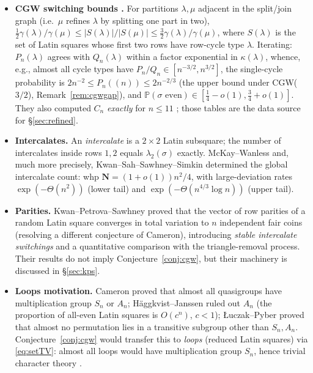 \documentclass[11pt]{article}
\theoremstyle{definition}
\renewcommand{\Pr}{\mathbb{P}}
\newcommand{\PP}{P}
\newcommand{\QQ}{Q}
\newcommand{\CC}{C}
\begin{document}
\begin{itemize}[leftmargin=2em]
\item \textbf{CGW switching bounds \cite{CGW08}.}  For partitions
$\lambda,\mu$ adjacent in the split/join graph (i.e.\ $\mu$ refines
$\lambda$ by splitting one part in two),
$\tfrac12\gamma(\lambda)/\gamma(\mu)\le |S(\lambda)|/|S(\mu)| \le
\tfrac32\gamma(\lambda)/\gamma(\mu)$, where $S(\lambda)$ is the set of Latin
squares whose first two rows have row-cycle type $\lambda$.  Iterating:
$\PP_n(\lambda)$ agrees with $\QQ_n(\lambda)$ within a factor
exponential in $\kappa(\lambda)$, whence, e.g., almost all cycle types have
$\PP_n/\QQ_n\in[n^{-3/2},n^{3/2}]$, the single-cycle probability is
$2n^{-2}\le \PP_n((n))\le 2n^{-2/3}$ (the upper bound under CGW($3/2$), Remark~\ref{rem:cgwgap}), and
$\Pr(\sigma\text{ even})\in[\tfrac14-o(1),\tfrac34+o(1)]$.
They also computed $\CC_n$ \emph{exactly} for $n\le 11$
\cite[Tables 1--2]{CGW08}; those tables are the data source for
\S\ref{sec:refined}.
\item \textbf{Intercalates.}  An \emph{intercalate} is a $2\times2$ Latin
subsquare; the number of intercalates inside rows $1,2$ equals
$\lambda_2(\sigma)$ exactly.  McKay--Wanless \cite{McKW99} and, much more
precisely, Kwan--Sah--Sawhney--Simkin \cite{KSSS22} determined the global
intercalate count: whp $\mathbf N=(1+o(1))n^2/4$, with large-deviation rates
$\exp(-\Theta(n^2))$ (lower tail) and $\exp(-\Theta(n^{4/3}\log n))$ (upper
tail).
\item \textbf{Parities.}  Kwan--Petrova--Sawhney \cite{KPS25} proved that the
vector of row parities of a random Latin square converges in total variation
to $n$ independent fair coins (resolving a different conjecture of Cameron),
introducing \emph{stable intercalate switchings} and a quantitative
comparison with the triangle-removal process.  Their results do not imply
Conjecture~\ref{conj:cgw}, but their machinery is discussed in
\S\ref{sec:kps}.
\item \textbf{Loops motivation.}  Cameron \cite{Cam92} proved that almost all
quasigroups have multiplication group $S_n$ or $A_n$;
H\"aggkvist--Janssen \cite{HJ96} ruled out $A_n$ (the proportion of all-even
Latin squares is $O(c^n)$, $c<1$); {\L}uczak--Pyber \cite{LP93} proved that
almost no permutation lies in a transitive subgroup other than $S_n,A_n$.
Conjecture~\ref{conj:cgw} would transfer this to \emph{loops} (reduced Latin
squares) via \eqref{eq:setTV}: almost all loops would have multiplication
group $S_n$, hence trivial character theory
\cite[Lemma 6.2]{CGW08}.
\end{itemize}
\end{document}
